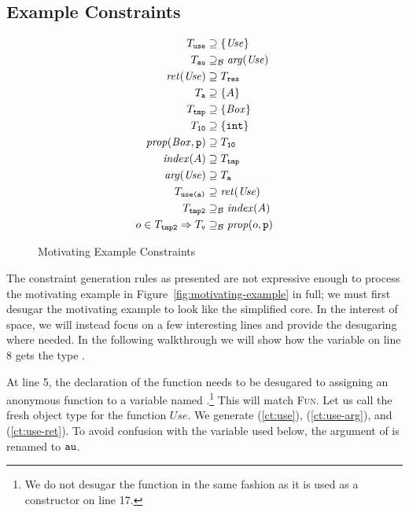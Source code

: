 \subsection{Example Constraints}
\label{sec:example-constraints}

\begin{figure}
\begin{align}
T_{\texttt{use}} & \supseteq \{\mathit{Use}\}\label{ct:use}\\
T_{\texttt{au}} & \supseteq_\mathcal{B} \mathit{arg}(\mathit{Use})\label{ct:use-arg}\\
\mathit{ret}(\mathit{Use}) & \supseteq T_{\texttt{res}}\label{ct:use-ret}\\
T_{\texttt{a}} & \supseteq \{A\} \label{ct:1}\\
T_{\texttt{tmp}} & \supseteq \{\mathit{Box}\} \label{ct:2}\\
T_{\texttt{10}} & \supseteq \{\texttt{int}\} \label{ct:3}\\
\mathit{prop}(\mathit{Box}, \texttt{p}) & \supseteq T_{\texttt{10}} \label{ct:4}\\
\mathit{index}(A) & \supseteq T_{\texttt{tmp}} \label{ct:5}\\
\mathit{arg}(\mathit{Use}) & \supseteq T_{\texttt{a}}\label{ct:6}\\
T_{\texttt{use(a)}} & \supseteq \mathit{ret}(\mathit{Use})\label{ct:7}\\
T_{\texttt{tmp2}} & \supseteq_\mathcal{B} \mathit{index}(A)\label{ct:8}\\
o \in T_{\texttt{tmp2}} \Rightarrow T_{\texttt{v}} & \supseteq_\mathcal{B} \mathit{prop}(o, \texttt{p})\label{ct:9}
\end{align}
\caption{Motivating Example Constraints}
\label{fig:example-constraints}
\end{figure}

The constraint generation rules as presented are not expressive enough to
process the motivating example in Figure~\ref{fig:motivating-example} in full;
we must first desugar the motivating example to look like the simplified
core. In the interest of space, we will instead focus on a few interesting
lines and provide the desugaring where needed. In the following walkthrough we will show how the variable  on line 8 gets the type .

At line 5, the declaration of the  function needs to be desugared to
assigning an anonymous function to a variable named .\footnote{We do
  not desugar the  function in the same fashion as it is used as a
  constructor on line 17.} This will match \textsc{Fun}. Let us call the fresh
object type for the function $\mathit{Use}$. We generate (\ref{ct:use}),
(\ref{ct:use-arg}), and (\ref{ct:use-ret}). To avoid confusion with the
variable  used below, the argument of  is renamed to
$\texttt{au}$.

